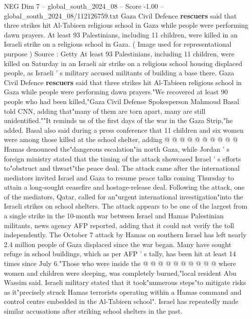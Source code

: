 \begin{textsample}{NEG Dim 7 – global\_south\_2024\_08 – Score -1.00 – global\_south\_2024\_08/112126759.txt}  \label{ex:f7_neg_277}
Gaza Civil Defence \textbf{rescuers} said that three strikes hit Al-Tabieen religious school in Gaza while people were performing dawn prayers.
At least 93 Palestinians, including 11 children, were killed in an Israeli strike on a religious school in Gaza. ( Image used for representational purpose ) Source : Getty At least 93 Palestinians, including 11 children, were killed on Saturday in an Israeli air strike on a religious school housing displaced people, as Israeli ' s military accused militants of building a base there.
Gaza Civil Defence \textbf{rescuers} said that three strikes hit Al-Tabieen religious school in Gaza while people were performing dawn prayers."We recovered at least 90 people who had been killed,"Gaza Civil Defense Spokesperson Mahmoud Basal told CNN, adding that"many of them are torn apart, many are still unidentified.""It reminds us of the first days of the war in the Gaza Strip,"he added.
Basal also said during a press conference that 11 children and six women were among those killed at the school shelter, adding @ @ @ @ @ @ @ @ @ @ Hamas denounced the"dangerous escalation"in north Gaza, while Jordan ' s foreign ministry stated that the timing of the attack showcased Israel ' s efforts to"obstruct and thwart"the peace deal.
The attack came after the international mediators invited Israel and Gaza to resume peace talks coming Thursday to attain a long-sought ceasefire and hostage-release deal.
Following the attack, one of the mediators, Qatar, called for an"urgent international investigation"into the Israeli strikes on school shelters.
The attack appears to be one of the largest from a single strike in the 10-month war between Israel and Hamas Palestinian militants, news agency AFP reported, adding that it could not verify the toll independently.
The October 7 attack by Hamas on southern Israel has left nearly 2.4 million people of Gaza displaced since the war began.
Many have sought refuge in school buildings, which as per AFP ' s tally, has been hit at least 14 times since July 6."Those who were inside the @ @ @ @ @ @ @ @ @ @ where women and children were sleeping, was completely burned,"local resident Abu Wassim said.
Israeli military stated that it took"numerous steps"to mitigate risks as it"precisely struck Hamas terrorists operating within a Hamas command and control centre embedded in the Al-Tabieen school".
Israel has repeatedly made similar accusations after striking school shelters in the past.

\end{textsample}
